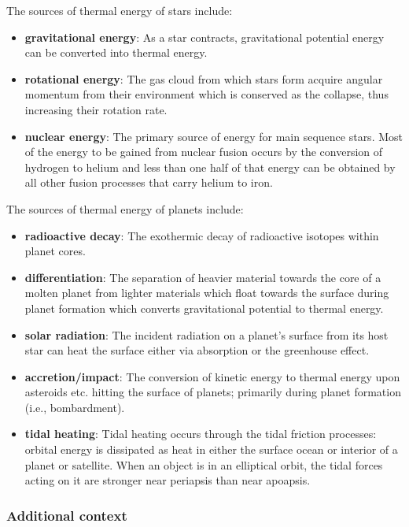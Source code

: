 \documentclass[a4paper,10pt]{article}
\begin{document}
The sources of thermal energy of stars include:

\begin{itemize}
    \item \textbf{gravitational energy}: As a star contracts, gravitational potential energy can be converted into thermal energy.
    \item \textbf{rotational energy}: The gas cloud from which stars form acquire angular momentum from their environment which is conserved as the collapse, thus increasing their rotation rate.
    \item \textbf{nuclear energy}: The primary source of energy for main sequence stars. Most of the energy to be gained from nuclear fusion occurs by the conversion of hydrogen to helium and less than one half of that energy can be obtained by all other fusion processes that carry helium to iron.
\end{itemize}

{\noindent}The sources of thermal energy of planets include:

\begin{itemize}
    \item \textbf{radioactive decay}: The exothermic decay of radioactive isotopes within planet cores.
    \item \textbf{differentiation}: The separation of heavier material towards the core of a molten planet from lighter materials which float towards the surface during planet formation which converts gravitational potential to thermal energy.
    \item \textbf{solar radiation}: The incident radiation on a planet's surface from its host star can heat the surface either via absorption or the greenhouse effect.
    \item \textbf{accretion/impact}: The conversion of kinetic energy to thermal energy upon asteroids etc. hitting the surface of planets; primarily during planet formation (i.e., bombardment).
    \item \textbf{tidal heating}: Tidal heating occurs through the tidal friction processes: orbital energy is dissipated as heat in either the surface ocean or interior of a planet or satellite. When an object is in an elliptical orbit, the tidal forces acting on it are stronger near periapsis than near apoapsis.
\end{itemize}

\subsubsection{Additional context}
\end{document}
